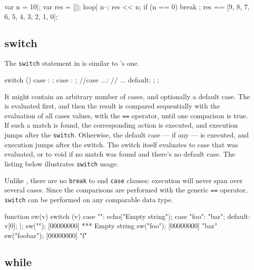 \begin{urbiassert}[firstnumber=last]
{
  var n = 10|;
  var res = []|;
  loop|
  {
    n--;
    res << n;
    if (n == 0)
      break
  };
  res
}
==
[9, 8, 7, 6, 5, 4, 3, 2, 1, 0];
\end{urbiassert}

\subsection{switch}

The \lstinline|switch| statement in \us is similar to \C's one.

\begin{urbiunchecked}[frame=, backgroundcolor=, ]
switch ()
{
  case :
    ;
  case :
    ;
//case ...:
//  ...
  default:
    ;
};
\end{urbiunchecked}

It might contain an arbitrary number of cases, and optionally a
default case. The  is evaluated first, and then the
result is compared sequentially with the evaluation of all cases
values, with the \lstinline|==| operator, until one comparison is
true. If such a match is found, the corresponding action is executed,
and execution jumps after the \lstinline|switch|. Otherwise, the
default case --- if any --- is executed, and execution jumps after the
switch. The switch itself evaluates to case that was evaluated, or to
void if no match was found and there's no default case. The listing below
illustrates \lstinline|switch| usage.

Unlike \C, there are no \lstinline|break| to end \lstinline|case|
clauses: execution will never span over several cases.  Since the
comparisons are performed with the generic \lstinline|==| operator,
\lstinline|switch| can be performed on any comparable data type.

\begin{urbiscript}[firstnumber=last]
function sw(v)
{
  switch (v)
  {
    case "":
      echo("Empty string");
    case "foo":
      "bar";
    default:
      v[0];
  }
}|;
sw("");
[00000000] *** Empty string
sw("foo");
[00000000] "bar"
sw("foobar");
[00000000] "f"
\end{urbiscript}

\subsection{while}

